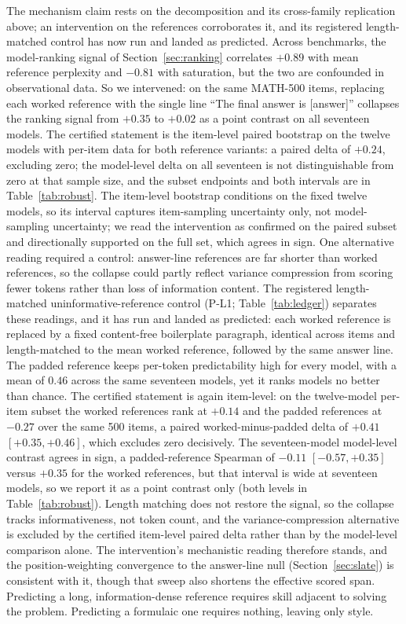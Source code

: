 The mechanism claim rests on the decomposition and its cross-family replication above; an intervention on the references corroborates it, and its registered length-matched control has now run and landed as predicted.
Across benchmarks, the model-ranking signal of Section~\ref{sec:ranking} correlates $+0.89$ with mean reference perplexity and $-0.81$ with saturation, but the two are confounded in observational data.
So we intervened: on the same \textsc{MATH-500} items, replacing each worked reference with the single line ``The final answer is [answer]'' collapses the ranking signal from $+0.35$ to $+0.02$ as a point contrast on all seventeen models.
The certified statement is the item-level paired bootstrap on the twelve models with per-item data for both reference variants: a paired delta of $+0.24$, excluding zero; the model-level delta on all seventeen is not distinguishable from zero at that sample size, and the subset endpoints and both intervals are in Table~\ref{tab:robust}.
The item-level bootstrap conditions on the fixed twelve models, so its interval captures item-sampling uncertainty only, not model-sampling uncertainty; we read the intervention as confirmed on the paired subset and directionally supported on the full set, which agrees in sign.
One alternative reading required a control: answer-line references are far shorter than worked references, so the collapse could partly reflect variance compression from scoring fewer tokens rather than loss of information content.
The registered length-matched uninformative-reference control (P-L1; Table~\ref{tab:ledger}) separates these readings, and it has run and landed as predicted: each worked reference is replaced by a fixed content-free boilerplate paragraph, identical across items and length-matched to the mean worked reference, followed by the same answer line.
The padded reference keeps per-token predictability high for every model, with a mean \tfa{} of $0.46$ across the same seventeen models, yet it ranks models no better than chance.
The certified statement is again item-level: on the twelve-model per-item subset the worked references rank at $+0.14$ and the padded references at $-0.27$ over the same 500 items, a paired worked-minus-padded delta of $+0.41$ $[+0.35, +0.46]$, which excludes zero decisively.
The seventeen-model model-level contrast agrees in sign, a padded-reference Spearman of $-0.11$ $[-0.57, +0.35]$ versus $+0.35$ for the worked references, but that interval is wide at seventeen models, so we report it as a point contrast only (both levels in Table~\ref{tab:robust}).
Length matching does not restore the signal, so the collapse tracks informativeness, not token count, and the variance-compression alternative is excluded by the certified item-level paired delta rather than by the model-level comparison alone.
The intervention's mechanistic reading therefore stands, and the position-weighting convergence to the answer-line null (Section~\ref{sec:slate}) is consistent with it, though that sweep also shortens the effective scored span.
Predicting a long, information-dense reference requires skill adjacent to solving the problem.
Predicting a formulaic one requires nothing, leaving only style.

